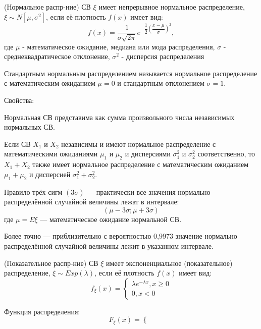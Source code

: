 \begin{multicols}{2}
    \begin{definition}{(Нормальное распр-ние)}{}
        СВ $\xi$ имеет непрерывное нормальное распределение, $\xi \sim N[\mu,\sigma^2]$, если её плотность $f(x)$ имеет вид:
        \[
        f(x) = \dfrac{1}{\sigma \sqrt{2\pi}} e^{-\dfrac{1}{2}\left(\dfrac{x-\mu}{\sigma}\right)^2},
        \]
        где $\mu$ - математическое ожидание, медиана или мода распределения, $\sigma$ - среднеквадратическое отклонение, $\sigma^2$ - дисперсия распределения
    \end{definition}
    Стандартным нормальным распределением называется нормальное распределение с математическим ожиданием $\mu =0$ и стандартным отклонением $\sigma =1$.
    \par
    Свойства:
    \begin{enumerate*}
        \item Нормальная СВ представима как сумма произвольного числа независимых нормальных СВ.
        \par
        Если СВ $X_1$ и $X_2$ независимы и имеют нормальное распределение с математическими ожиданиями $\mu_1$ и $\mu_2$ и дисперсиями $\sigma_1^2$ и $\sigma_2^2$ соответственно, то $X_1 + X_2$ также имеет нормальное распределение с математическим ожиданием $\mu_1 + \mu_2$ и дисперсией $\sigma_1^2 + \sigma_2^2$.
        \item Правило трёх сигм $(3\sigma)$ — практически все значения нормально распределённой случайной величины лежат в интервале: 
        \[
        (\mu -3\sigma ;\mu +3\sigma)
        \]
        где $\mu = E\xi$ — математическое ожидание нормальной СВ.
        \par
        Более точно — приблизительно с вероятностью 0,9973 значение нормально распределённой случайной величины лежит в указанном интервале.
    \end{enumerate*}
    \begin{definition}{(Показательное распр-ние)}{}
        СВ $\xi$ имеет экспоненциальное (показательное) распределение, $\xi \sim Exp(\lambda)$, если её плотность $f(x)$ имеет вид:
        \[
        f_\xi(x) =
        \left\{ 
        \begin{array}{c}
             \lambda e^{-\lambda x}, x \geq 0 \\[0.3cm]
             0 , x < 0
        \end{array}\right.
        \]
    \end{definition}
    Функция распределения:
    \[
    F_\xi(x) = 
    \left\{ 
        \begin{array}{c}

\end{array}\]
\end{multicols}
